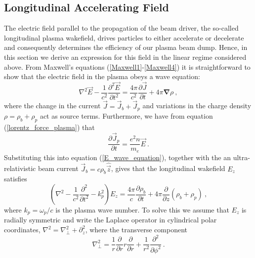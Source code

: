 \subsection{Longitudinal Accelerating Field} 
The electric field parallel to the propagation of the beam driver, the so-called longitudinal plasma wakefield, drives particles to either accelerate or decelerate and consequently determines the efficiency of our plasma beam dump. Hence, in this section we derive an expression for this field in the linear regime considered above. 
From Maxwell's equations (\ref{Maxwell1}-\ref{Maxwell4}) it is straightforward to show that the electric field in the plasma obeys a wave equation:
\begin{equation}
\nabla^2\vec{E}-\frac{1}{c^2}\frac{\partial^2 \vec{E}}{\partial t^2}=\frac{4\pi}{c^2}\frac{\partial \vec{J}}{\partial t}+4\pi\boldsymbol{\nabla}\rho~,
\label{E_wave_equation}
\end{equation}
where the change in the current $\vec{J}=\vec{J}_b+\vec{J}_p$ and variations in the charge density $\rho=\rho_b+\rho_p$ act as source terms. Furthermore, we have from equation (\ref{lorentz_force_plasma}) that 
\begin{equation}
\frac{\partial \vec{J}_p}{\partial t}=\frac{e^2 n}{m_e}\vec{E}~.
\end{equation}
Substituting this into equation (\ref{E_wave_equation}), together with the an ultra-relativistic beam current $\vec{J}_b=c\rho_b\hat{\vec{z}}$, gives that the longitudinal wakefield $E_z$ satisfies
\begin{equation}
\left(\nabla^2-\frac{1}{c^2}\frac{\partial^2}{\partial t^2}-k_p^2\right)E_z=\frac{4\pi}{c}\frac{\partial \rho_b}{\partial t}+4\pi\frac{\partial}{\partial z}\left(\rho_b+\rho_p\right)~,
\label{Ez_wave_equation}
\end{equation}
where $k_p=\omega_p/c$ is the plasma wave number. To solve this we assume that $E_z$ is radially symmetric and write the Laplace operator in cylindrical polar coordinates, $\nabla^2=\nabla^2_{\perp}+\partial^2_z$, where the transverse component
\begin{equation}
\nabla_{\perp}^2=\frac{1}{r}\frac{\partial }{\partial r}r\frac{\partial }{\partial r} +\frac{1}{r^2}\frac{\partial^2 }{\partial \phi^2} ~.
\end{equation}

